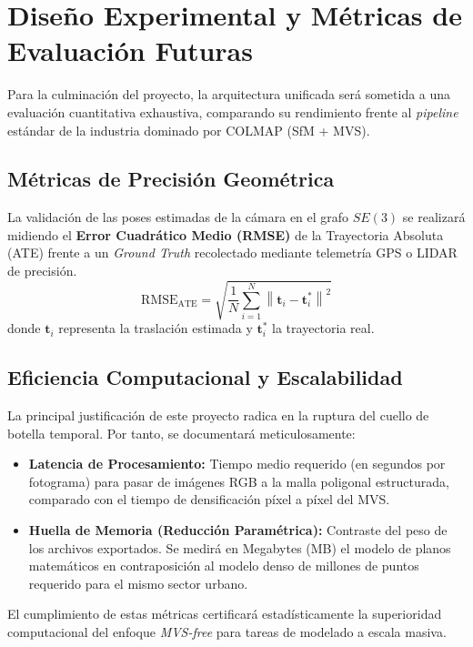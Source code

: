\section{Diseño Experimental y Métricas de Evaluación Futuras}

Para la culminación del proyecto, la arquitectura unificada será sometida a una evaluación cuantitativa exhaustiva, comparando su rendimiento frente al \textit{pipeline} estándar de la industria dominado por COLMAP (SfM + MVS).

\subsection{Métricas de Precisión Geométrica}
La validación de las poses estimadas de la cámara en el grafo $SE(3)$ se realizará midiendo el \textbf{Error Cuadrático Medio (RMSE)} de la Trayectoria Absoluta (ATE) frente a un \textit{Ground Truth} recolectado mediante telemetría GPS o LIDAR de precisión.
\begin{equation}
    \text{RMSE}_{\text{ATE}} = \sqrt{ \frac{1}{N} \sum_{i=1}^{N} \left\| \mathbf{t}_i - \mathbf{t}_i^* \right\|^2 }
\end{equation}
donde $\mathbf{t}_i$ representa la traslación estimada y $\mathbf{t}_i^*$ la trayectoria real.

\subsection{Eficiencia Computacional y Escalabilidad}
La principal justificación de este proyecto radica en la ruptura del cuello de botella temporal. Por tanto, se documentará meticulosamente:
\begin{itemize}
    \item \textbf{Latencia de Procesamiento:} Tiempo medio requerido (en segundos por fotograma) para pasar de imágenes RGB a la malla poligonal estructurada, comparado con el tiempo de densificación píxel a píxel del MVS.
    \item \textbf{Huella de Memoria (Reducción Paramétrica):} Contraste del peso de los archivos exportados. Se medirá en Megabytes (MB) el modelo de planos matemáticos en contraposición al modelo denso de millones de puntos requerido para el mismo sector urbano.
\end{itemize}

El cumplimiento de estas métricas certificará estadísticamente la superioridad computacional del enfoque \textit{MVS-free} para tareas de modelado a escala masiva.